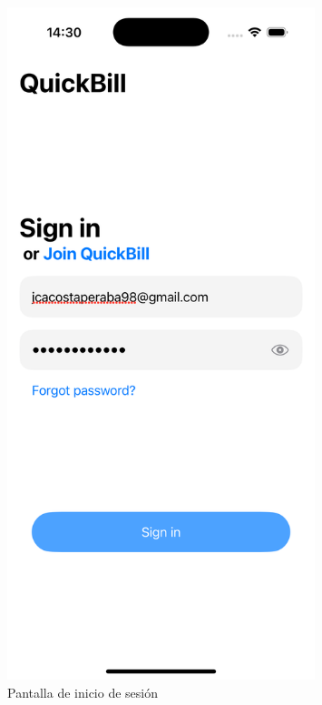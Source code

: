 \begin{large}
\begin{figure}[H]
  \centering
  \begin{minipage}[t]{0.45\textwidth}
    \centering
    \includegraphics[width=0.8\textwidth]{Ilustraciones/ios_sign_in.png}
    \caption{Pantalla de inicio de sesión}
    \label{fig:ios_sign_in}
  \end{minipage}\hfill
  \begin{minipage}[t]{0.45\textwidth}
    \centering

\end{minipage}
\end{figure}
\end{large}
